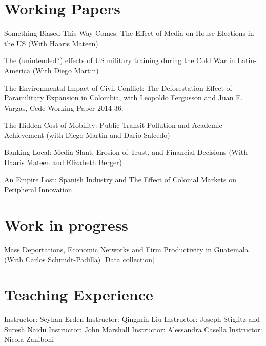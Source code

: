 \documentclass{moderncv}
\begin{document}
\section{\textbf{Working Papers}}
{Something Biased This Way Comes: The Effect of Media on House Elections in the US (With Haaris Mateen) \\ }

{The (unintended?) effects of US military training during the Cold War in Latin-America (With Diego Martin) \\ }

{The Environmental Impact of Civil Conflict: The Deforestation Effect of Paramilitary Expansion in Colombia, with Leopoldo Fergusson and Juan F. Vargas, Cede Working Paper 2014-36.\\}

{The Hidden Cost of Mobility: Public Transit  Pollution and Academic Achievement (with Diego Martin and Dario Salcedo) \\ }

{Banking Local: Media Slant, Erosion of Trust, and Financial Decisions (With Haaris Mateen and Elizabeth Berger)  \\ }

{An Empire Lost: Spanish Industry and The Effect of Colonial Markets on Peripheral  Innovation}

\section{\textbf{Work in progress}}

{Mass Deportations, Economic Networks and Firm Productivity in Guatemala (With Carlos Schmidt-Padilla)  [Data collection] \\ }

\section{\textbf{Teaching Experience}}
 {}{}{Instructor: Seyhan Erden}
 {}{}{Instructor: Qingmin Liu}
 {}{}{Instructor: Joseph Stiglitz and Suresh Naidu}
 {}{}{Instructor: John Marshall}
 {}{}{Instructor: Alessandra Casella}
 {}{}{Instructor: Nicola Zaniboni}
\end{document}
